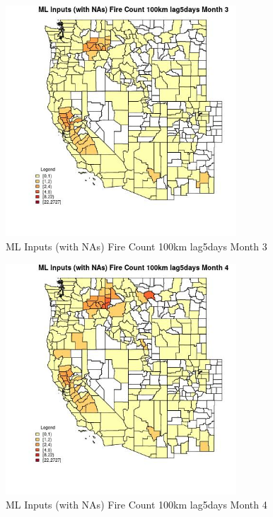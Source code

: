 \begin{figure} 
\centering  
\includegraphics[width=0.77\textwidth]{Code_Outputs/Report_ML_input_PM25_Step4_part_f_de_duplicated_aves_prioritize_24hr_obswNAs_CountyFire_Count_100km_lag5daysmedianMonth3.jpg} 
\caption{\label{fig:Report_ML_input_PM25_Step4_part_f_de_duplicated_aves_prioritize_24hr_obswNAsCountyFire_Count_100km_lag5daysmedianMonth3}ML Inputs (with NAs) Fire Count 100km lag5days Month 3} 
\end{figure} 
 

\begin{figure} 
\centering  
\includegraphics[width=0.77\textwidth]{Code_Outputs/Report_ML_input_PM25_Step4_part_f_de_duplicated_aves_prioritize_24hr_obswNAs_CountyFire_Count_100km_lag5daysmedianMonth4.jpg} 
\caption{\label{fig:Report_ML_input_PM25_Step4_part_f_de_duplicated_aves_prioritize_24hr_obswNAsCountyFire_Count_100km_lag5daysmedianMonth4}ML Inputs (with NAs) Fire Count 100km lag5days Month 4} 
\end{figure} 
 

